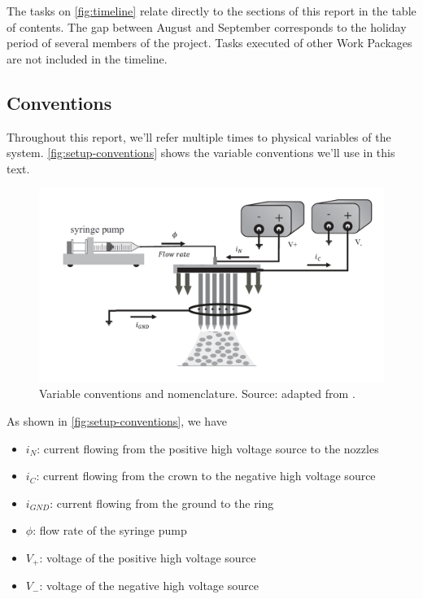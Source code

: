 \documentclass[oneside,12pt]{article}
\begin{document}
The tasks on \autoref{fig:timeline} relate directly to the sections of this report in the table of contents. 
The gap between August and September 
corresponds to the holiday period of several members of the project. Tasks executed of other Work Packages are not included in 
the timeline.

\subsection{Conventions}

Throughout this report, we'll refer multiple times to physical variables of the system. \autoref{fig:setup-conventions}
shows the variable conventions we'll use in this text.

\begin{figure}[h!]
    \centering
    \includegraphics[width=.9\textwidth,trim=1 1 1 1,clip]{figures/setup-conventions.png}
    \caption{Variable conventions and nomenclature. Source: adapted from \cite{Verdoold2013}.}
    \label{fig:setup-conventions}
\end{figure}

As shown in \autoref{fig:setup-conventions}, we have

\begin{itemize}
    \item $i_N$: current flowing from the positive high voltage source to the nozzles
    \item $i_C$: current flowing from the crown to the negative high voltage source
    \item $i_{GND}$: current flowing from the ground to the ring
    \item $\phi$: flow rate of the syringe pump
    \item $V_+$: voltage of the positive high voltage source
    \item $V_-$: voltage of the negative high voltage source
\end{itemize}
\end{document}
